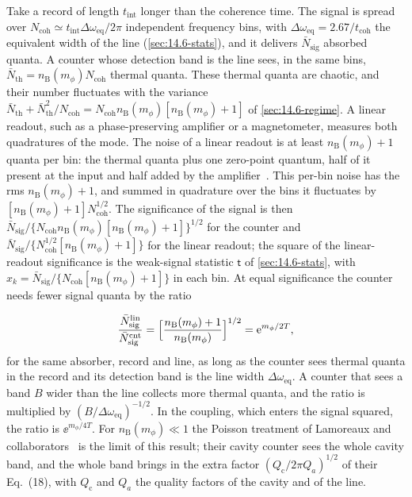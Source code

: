 Take a record of length $t_{\mathrm{int}}$ longer than the coherence time. The signal is spread over $N_{\mathrm{coh}} \simeq t_{\mathrm{int}}\Delta\omega_{\mathrm{eq}}/2\pi$ independent frequency bins, with $\Delta\omega_{\mathrm{eq}} = 2.67/t_{\mathrm{coh}}$ the equivalent width of the line (\cref{sec:14.6-stats}), and it delivers $\bar N_{\mathrm{sig}}$ absorbed quanta. A counter whose detection band is the line sees, in the same bins, $\bar N_{\mathrm{th}} = n_{\mathrm{B}}(m_\phi)N_{\mathrm{coh}}$ thermal quanta. These thermal quanta are chaotic, and their number fluctuates with the variance $\bar N_{\mathrm{th}} + \bar N_{\mathrm{th}}^2/N_{\mathrm{coh}} = N_{\mathrm{coh}}n_{\mathrm{B}}(m_\phi)[n_{\mathrm{B}}(m_\phi) + 1]$ of \cref{sec:14.6-regime}. A linear readout, such as a phase-preserving amplifier or a magnetometer, measures both quadratures of the mode. The noise of a linear readout is at least $n_{\mathrm{B}}(m_\phi) + 1$ quanta per bin: the thermal quanta plus one zero-point quantum, half of it present at the input and half added by the amplifier~\cite[Eq.~(9)]{lamoreaux2013analysis}. This per-bin noise has the rms $n_{\mathrm{B}}(m_\phi) + 1$, and summed in quadrature over the bins it fluctuates by $[n_{\mathrm{B}}(m_\phi) + 1]N_{\mathrm{coh}}^{1/2}$. The significance of the signal is then $\bar N_{\mathrm{sig}}/\{N_{\mathrm{coh}}n_{\mathrm{B}}(m_\phi)[n_{\mathrm{B}}(m_\phi) + 1]\}^{1/2}$ for the counter and $\bar N_{\mathrm{sig}}/\{N_{\mathrm{coh}}^{1/2}[n_{\mathrm{B}}(m_\phi) + 1]\}$ for the linear readout; the square of the linear-readout significance is the weak-signal statistic $\mathsf{t}$ of \cref{sec:14.6-stats}, with $x_k = \bar N_{\mathrm{sig}}/\{N_{\mathrm{coh}}[n_{\mathrm{B}}(m_\phi) + 1]\}$ in each bin. At equal significance the counter needs fewer signal quanta by the ratio
\begin{keyresult}
\begin{equation}
  \frac{\bar N_{\mathrm{sig}}^{\mathrm{lin}}}{\bar N_{\mathrm{sig}}^{\mathrm{cnt}}} = \Bigl[\frac{n_{\mathrm{B}}(m_\phi) + 1}{n_{\mathrm{B}}(m_\phi)}\Bigr]^{1/2} = \mathrm{e}^{m_\phi/2T} ,
  \label{eq:17.2-ratio}
\end{equation}
for the same absorber, record and line, as long as the counter sees thermal quanta in the record and its detection band is the line width $\Delta\omega_{\mathrm{eq}}$. A counter that sees a band $B$ wider than the line collects more thermal quanta, and the ratio is multiplied by $(B/\Delta\omega_{\mathrm{eq}})^{-1/2}$. In the coupling, which enters the signal squared, the ratio is $\ee^{m_\phi/4T}$. For $n_{\mathrm{B}}(m_\phi) \ll 1$ the Poisson treatment of Lamoreaux and collaborators~\cite[Eqs.~(12)--(14)]{lamoreaux2013analysis} is the limit of this result; their cavity counter sees the whole cavity band, and the whole band brings in the extra factor $(Q_{\mathrm{c}}/2\pi Q_a)^{1/2}$ of their Eq.~(18), with $Q_{\mathrm{c}}$ and $Q_a$ the quality factors of the cavity and of the line.
\end{keyresult}

